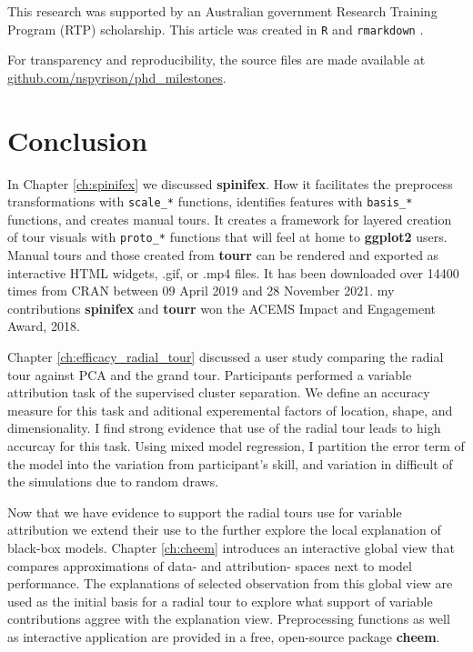 \documentclass{template/monashthesis}
\begin{document}
This research was supported by an Australian government Research Training Program (RTP) scholarship. This article was created in \texttt{R} \autocite{r_core_team_r:_2020} and \texttt{rmarkdown} \autocite{xie_r_2018}.

For transparency and reproducibility, the source files are made available at \href{https://github.com/nspyrison/phd_milestones}{github.com/nspyrison/phd\_milestones}.

\hypertarget{ch:conclusion}{%
\chapter{Conclusion}\label{ch:conclusion}}

In Chapter \ref{ch:spinifex} we discussed \textbf{spinifex}. How it facilitates the preprocess transformations with \texttt{scale\_*} functions, identifies features with \texttt{basis\_*} functions, and creates manual tours. It creates a framework for layered creation of tour visuals with \texttt{proto\_*} functions that will feel at home to \textbf{ggplot2} users. Manual tours and those created from \textbf{tourr} can be rendered and exported as interactive HTML widgets, .gif, or .mp4 files. It has been downloaded over 14400 times from CRAN between 09 April 2019 and 28 November 2021. my contributions \textbf{spinifex} and \textbf{tourr} won the ACEMS Impact and Engagement Award, 2018.

Chapter \ref{ch:efficacy_radial_tour} discussed a user study comparing the radial tour against PCA and the grand tour. Participants performed a variable attribution task of the supervised cluster separation. We define an accuracy measure for this task and aditional experemental factors of location, shape, and dimensionality. I find strong evidence that use of the radial tour leads to high accurcay for this task. Using mixed model regression, I partition the error term of the model into the variation from participant's skill, and variation in difficult of the simulations due to random draws.

Now that we have evidence to support the radial tours use for variable attribution we extend their use to the further explore the local explanation of black-box models. Chapter \ref{ch:cheem} introduces an interactive global view that compares approximations of data- and attribution- spaces next to model performance. The explanations of selected observation from this global view are used as the initial basis for a radial tour to explore what support of variable contributions aggree with the explanation view. Preprocessing functions as well as interactive application are provided in a free, open-source package \textbf{cheem}.
\end{document}
